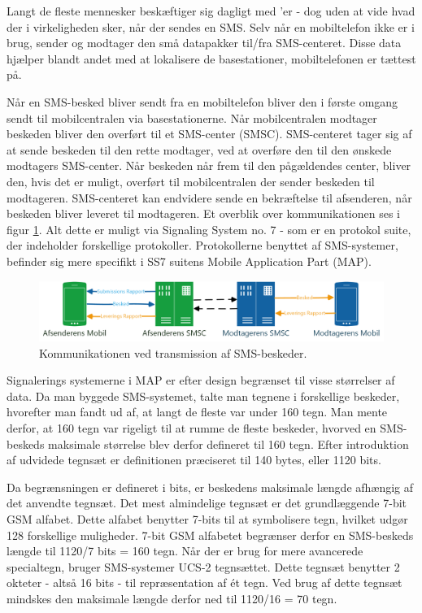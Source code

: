 Langt de fleste mennesker beskæftiger sig dagligt med 'er - dog uden at vide hvad der i virkeligheden sker, når der sendes en SMS. Selv når en mobiltelefon ikke er i brug, sender og modtager den små datapakker til/fra SMS-centeret. Disse data hjælper blandt andet med at lokalisere de basestationer, mobiltelefonen er tættest på.

Når en SMS-besked bliver sendt fra en mobiltelefon bliver den i første omgang sendt til mobilcentralen via basestationerne. Når mobilcentralen modtager beskeden bliver den overført til et SMS-center (SMSC). SMS-centeret tager sig af at sende beskeden til den rette modtager, ved at overføre den til den ønskede modtagers SMS-center. Når beskeden når frem til den pågældendes center, bliver den, hvis det er muligt, overført til mobilcentralen der sender beskeden til modtageren. SMS-centeret kan endvidere sende en bekræftelse til afsenderen, når beskeden bliver leveret til modtageren. Et overblik over kommunikationen ses i figur \ref{smsTransm}. Alt dette er muligt via Signaling System no. 7 - som er en protokol suite, der indeholder forskellige protokoller. Protokollerne benyttet af SMS-systemer, befinder sig mere specifikt i SS7 suitens Mobile Application Part (MAP). \cite{Pro_1} \cite{sms_max1}

\noindent
\begin{figure}[hba]
\includegraphics[width=\linewidth]{Billeder/Mobil.png}
\caption {Kommunikationen ved transmission af SMS-beskeder.}
\label{smsTransm}
\end{figure}

Signalerings systemerne i MAP er efter design begrænset til visse størrelser af data. Da man byggede SMS-systemet, talte man tegnene i forskellige beskeder, hvorefter man fandt ud af, at langt de fleste var under 160 tegn. Man mente derfor, at 160 tegn var rigeligt til at rumme de fleste beskeder, hvorved en SMS-beskeds maksimale størrelse blev derfor defineret til 160 tegn. Efter introduktion af udvidede tegnsæt er definitionen præciseret til 140 bytes, eller 1120 bits. \cite{sms_max1} \cite{sms_max2}


Da begrænsningen er defineret i bits, er beskedens maksimale længde afhængig af det anvendte tegnsæt. Det mest almindelige tegnsæt er det grundlæggende 7-bit GSM alfabet. Dette alfabet benytter 7-bits til at symbolisere tegn, hvilket udgør 128 forskellige muligheder. 7-bit GSM alfabetet begrænser derfor en SMS-beskeds længde til 1120/7 bits = 160 tegn. Når der er brug for mere avancerede specialtegn, bruger SMS-systemer UCS-2 tegnsættet. Dette tegnsæt benytter 2 okteter - altså 16 bits - til repræsentation af ét tegn. Ved brug af dette tegnsæt mindskes den maksimale længde derfor ned til 1120/16 = 70 tegn. \cite{sms_pdu}

